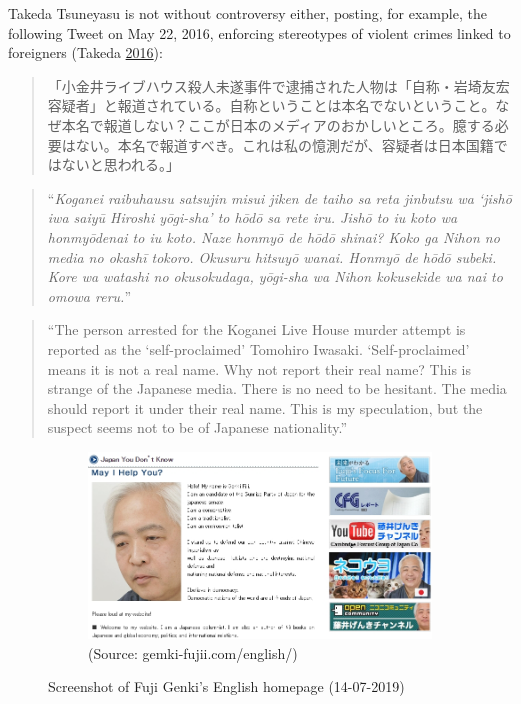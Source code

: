 \documentclass[10pt,british,A4paper,oneside]{memoir}
\begin{document}
Takeda Tsuneyasu is not without controversy either, posting, for
example, the following Tweet on May 22, 2016, enforcing stereotypes of
violent crimes linked to foreigners (Takeda
\protect\hyperlink{ref-takeda_eng._2016}{2016}):

\begin{quote}
「小金井ライブハウス殺人未遂事件で逮捕された人物は「自称・岩埼友宏容疑者」と報道されている。自称ということは本名でないということ。なぜ本名で報道しない？ここが日本のメディアのおかしいところ。臆する必要はない。本名で報道すべき。これは私の憶測だが、容疑者は日本国籍ではないと思われる。」
\end{quote}

\begin{quote}
``\emph{Koganei raibuhausu satsujin misui jiken de taiho sa reta
jinbutsu wa `jishō iwa saiyū Hiroshi yōgi-sha' to hōdō sa rete iru.
Jishō to iu koto wa honmyōdenai to iu koto. Naze honmyō de hōdō shinai?
Koko ga Nihon no media no okashī tokoro. Okusuru hitsuyō wanai. Honmyō
de hōdō subeki. Kore wa watashi no okusokudaga, yōgi-sha wa Nihon
kokusekide wa nai to omowa reru.}''
\end{quote}

\begin{quote}
``The person arrested for the Koganei Live House murder attempt is
reported as the `self-proclaimed' Tomohiro Iwasaki. `Self-proclaimed'
means it is not a real name. Why not report their real name? This is
strange of the Japanese media. There is no need to be hesitant. The
media should report it under their real name. This is my speculation,
but the suspect seems not to be of Japanese nationality.''
\end{quote}

\begin{figure}[!htb]
 \centering
 \begin{subfigure}[b]{1\textwidth}
 \includegraphics[width=\textwidth]{images/genkifuji.jpg}
 \caption*{(Source: gemki-fujii.com/english/)}
 \end{subfigure}
 \caption{Screenshot of Fuji Genki’s English homepage (14-07-2019)}\label{fig:genkifuji}
\end{figure}
\end{document}
